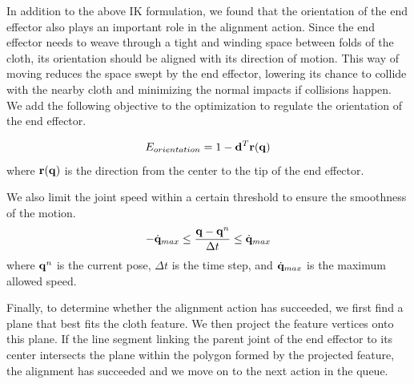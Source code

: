 In addition to the above IK formulation, we found that the orientation of the end effector also plays an important role in the alignment action. Since the end effector needs to weave through a tight and winding space between folds of the cloth, its orientation should be aligned with its direction of motion. This way of moving reduces the space swept by the end effector, lowering its chance to collide with the nearby cloth and minimizing the normal impacts if collisions happen. We add the following objective to the optimization to regulate the orientation of the end effector.

\begin{equation}
  E_{orientation} = 1-\mathbf{d}^T\mathbf{r(q})
  \label{eq:orientation}
\end{equation}
where $\mathbf{r(q)}$ is the direction from the center to the tip of the end effector.

We also limit the joint speed within a certain threshold to ensure the smoothness of the motion.
\begin{equation}
  -\dot{\mathbf{q}}_{max} \leq \frac{\mathbf{q} - \mathbf{q}^n}{\Delta t} \leq \dot{\mathbf{q}}_{max}
  \label{eq:speed}
\end{equation}
where $\mathbf{q}^n$ is the current pose, $\Delta t$ is the time step, and $\dot{\mathbf{q}}_{max}$ is the maximum allowed speed.

Finally, to determine whether the alignment action has succeeded, we first find a plane that best fits the cloth feature. We then project the feature vertices onto this plane. If the line segment linking the parent joint of the end effector to its center intersects the plane within the polygon formed by the projected feature, the alignment has succeeded and we move on to the next action in the queue.


